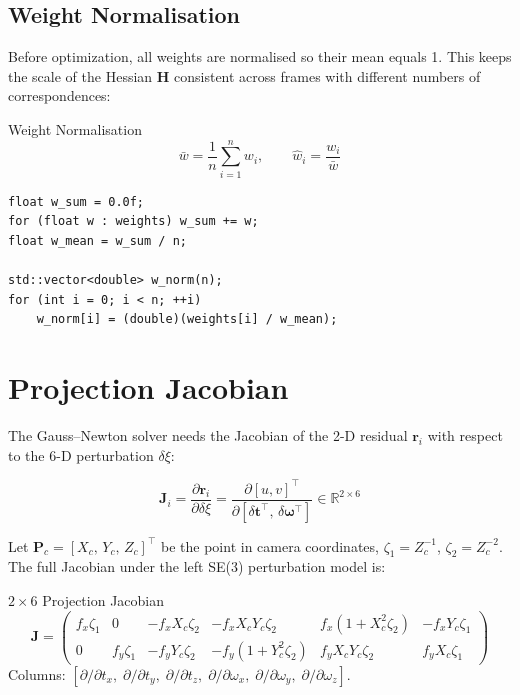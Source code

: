 \documentclass[12pt,a4paper]{article}
\begin{document}
\subsection{Weight Normalisation}

Before optimization, all weights are normalised so their mean equals 1. This keeps
the scale of the Hessian $\mathbf{H}$ consistent across frames with different
numbers of correspondences:

\begin{formulabox}{Weight Normalisation}
\begin{equation}
  \bar{w} = \frac{1}{n}\sum_{i=1}^{n} w_i, \qquad
  \hat{w}_i = \frac{w_i}{\bar{w}}
  \label{eq:wnorm}
\end{equation}
\end{formulabox}

\begin{lstlisting}[style=cpp,
  caption={Weight normalisation ---
           \texttt{relocalization.cpp}, lines\,1218--1226}]
float w_sum = 0.0f;
for (float w : weights) w_sum += w;
float w_mean = w_sum / n;

std::vector<double> w_norm(n);
for (int i = 0; i < n; ++i)
    w_norm[i] = (double)(weights[i] / w_mean);
\end{lstlisting}

\section{Projection Jacobian}

The Gauss--Newton solver needs the Jacobian of the 2-D residual
$\mathbf{r}_i$ with respect to the 6-D perturbation $\delta\xi$:

\begin{equation}
  \mathbf{J}_i
    = \frac{\partial\mathbf{r}_i}{\partial\delta\xi}
    = \frac{\partial[u,v]^\top}{\partial[\delta\mathbf{t}^\top,\,\delta\boldsymbol{\omega}^\top]}
    \in \mathbb{R}^{2\times6}
\end{equation}

Let $\mathbf{P}_c = [X_c,\,Y_c,\,Z_c]^\top$ be the point in camera coordinates,
$\zeta_1 = Z_c^{-1}$, $\zeta_2 = Z_c^{-2}$.
The full Jacobian under the left SE(3) perturbation model is:

\begin{formulabox}{$2\times6$ Projection Jacobian}
\begin{equation}
\mathbf{J} = \begin{pmatrix}
  f_x\zeta_1 & 0 & -f_x X_c\zeta_2 &
    -f_x X_c Y_c\zeta_2 & f_x(1+X_c^2\zeta_2) & -f_x Y_c\zeta_1 \\[4pt]
  0 & f_y\zeta_1 & -f_y Y_c\zeta_2 &
    -f_y(1+Y_c^2\zeta_2) & f_y X_c Y_c\zeta_2 &  f_y X_c\zeta_1
\end{pmatrix}
\label{eq:jac}
\end{equation}
Columns: $[\partial/\partial t_x,\;\partial/\partial t_y,\;\partial/\partial t_z,\;
\partial/\partial\omega_x,\;\partial/\partial\omega_y,\;\partial/\partial\omega_z]$.
\end{formulabox}
\end{document}
